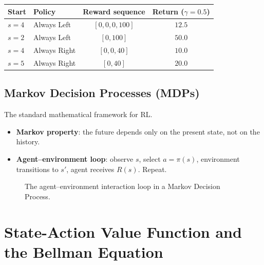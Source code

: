 \begin{center}
\begin{tabular}{llcc}
\toprule
Start & Policy & Reward sequence & Return ($\gamma=0.5$)\\
\midrule
$s=4$ & Always Left  & $[0,0,0,100]$ & $12.5$\\
$s=2$ & Always Left  & $[0,100]$     & $50.0$\\
$s=4$ & Always Right & $[0,0,40]$    & $10.0$\\
$s=5$ & Always Right & $[0,40]$      & $20.0$\\
\bottomrule
\end{tabular}
\end{center}

\subsection{Markov Decision Processes (MDPs)}

The standard mathematical framework for RL.

\begin{itemize}
\item \textbf{Markov property}: the future depends only on the present state,
  not on the history.
\item \textbf{Agent--environment loop}: observe $s$, select $a=\pi(s)$,
  environment transitions to $s'$, agent receives $R(s)$. Repeat.
\end{itemize}

\begin{figure}[h]
\centering
{}
\caption{The agent--environment interaction loop in a Markov Decision Process.}
\label{fig:mdp-loop}
\end{figure}

\section{State-Action Value Function and the Bellman Equation}

